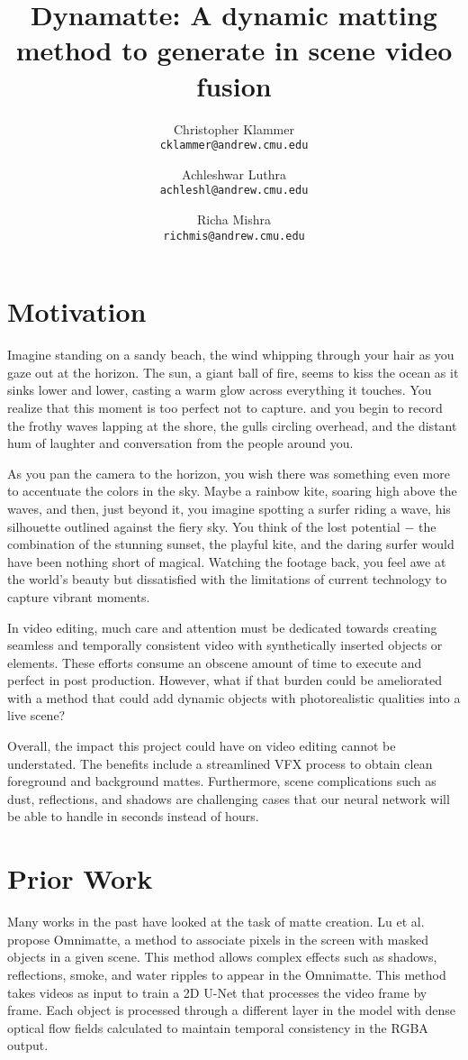 \documentclass{article}
\title{Dynamatte: A dynamic matting method to generate in scene video fusion}
\author{Christopher Klammer \\ 
\small\texttt{cklammer@andrew.cmu.edu}
\and
Achleshwar Luthra \\
\small\texttt{achleshl@andrew.cmu.edu}
\and
Richa Mishra \\
\small\texttt{richmis@andrew.cmu.edu}}
\begin{document}
\maketitle

\section{Motivation}

Imagine standing on a sandy beach, the wind whipping through your hair as you gaze out at the horizon. The sun, a giant ball of fire, seems to kiss the ocean as it sinks lower and lower, casting a warm glow across everything it touches. You realize that this moment is too perfect not to capture. and you begin to record the frothy waves lapping at the shore, the gulls circling overhead, and the distant hum of laughter and conversation from the people around you.

As you pan the camera to the horizon, you wish there was something even more to accentuate the colors in the sky. Maybe a rainbow kite, soaring high above the waves, and then, just beyond it, you imagine spotting a surfer riding a wave, his silhouette outlined against the fiery sky. You think of the lost potential $-$ the combination of the stunning sunset, the playful kite, and the daring surfer would have been nothing short of magical. Watching the footage back, you feel awe at the world's beauty but dissatisfied with the limitations of current technology to capture vibrant moments.

In video editing, much care and attention must be dedicated towards creating seamless and temporally consistent video with synthetically inserted objects or elements. These efforts consume an obscene amount of time to execute and perfect in post production. However, what if that burden could be ameliorated with a method that could add dynamic objects with photorealistic qualities into a live scene? 

Overall, the impact this project could have on video editing cannot be understated. The benefits include a streamlined VFX process to obtain clean foreground and background mattes. Furthermore, scene complications such as dust, reflections, and shadows are challenging cases that our neural network will be able to handle in seconds instead of hours.

\section{Prior Work}
Many works in the past have looked at the task of matte creation. Lu et al.\cite{lu2021} propose Omnimatte, a method to associate pixels in the screen with masked objects in a given scene. This method allows complex effects such as shadows, reflections, smoke, and water ripples to appear in the Omnimatte. This method takes videos as input to train a 2D U-Net that processes the video frame by frame. Each object is processed through a different layer in the model with dense optical flow fields calculated to maintain temporal consistency in the RGBA output. 
\end{document}
